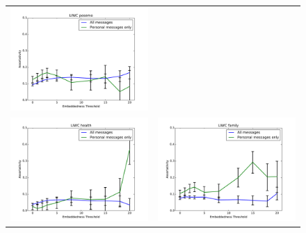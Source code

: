 \documentclass[11pt]{article}
\begin{document}
\begin{figure}
\begin{tabular}{cc}
\includegraphics[scale=.2]{posemo_corr.pdf}\\
\includegraphics[scale=.2]{health_corr.pdf} &
\includegraphics[scale=.2]{family_corr.pdf}

\end{tabular}
\end{figure}
\end{document}
